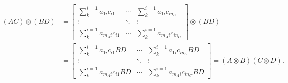 \begin{align*}
  (AC)\otimes (BD) &= \begin{bmatrix}
 \sum\limits_{k}^{i = 1}a_{1i}c_{i1} & \cdots & \sum\limits_{k}^{i = 1}a_{1i}c_{in_{C}}\\
 \vdots & \ddots & \vdots\\
 \sum\limits_{k}^{i = 1}a_{m_{A}i}c_{i1} & \cdots & \sum\limits_{k}^{i = 1}a_{m_{A}i}c_{in_{C}}
 \end{bmatrix} \otimes (BD)\\
 &=  \begin{bmatrix}
\sum\limits_{k}^{i = 1}a_{1i}c_{i1}BD & \cdots & \sum\limits_{k}^{i = 1}a_{1i}c_{in_{C}}BD\\
\vdots & \ddots & \vdots\\
\sum\limits_{k}^{i = 1}a_{m_{A}i}c_{i1}BD & \cdots & \sum\limits_{k}^{i = 1}a_{m_{A}i}c_{in_{C}}BD
\end{bmatrix} = (A\otimes B)(C\otimes D) .
\end{align*}
